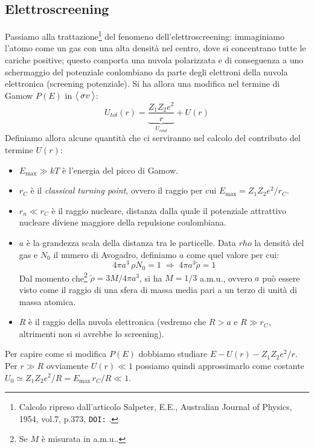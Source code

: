 \subsection{Elettroscreening}\label{0329-sec-screening}
Passiamo alla trattazione\footnote{Calcolo ripreso dall'articolo Salpeter, E.E., Australian Journal of Physics, 1954, vol.7, p.373, \texttt{DOI:} .} del fenomeno dell'elettroscreening: immaginiamo l'atomo come un gas con una alta densità nel centro, dove si concentrano tutte le cariche positive; questo comporta una nuvola polarizzata e di conseguenza a uno schermaggio del potenziale coulombiano da parte degli elettroni della nuvola elettronica (screening potenziale). Si ha allora una modifica nel termine di Gamow $P(E)$ in $\bigl\langle\, \sigma v\, \bigr\rangle$:
$$U_{tot} (r) = \underbrace{\frac{Z_1Z_2e^2}{r}}_{U_{coul}} + U(r)$$
Definiamo allora alcune quantità che ci serviranno nel calcolo del contributo del termine $U(r)$:
\begin{itemize}
    \item $E_{\max{}}\gg kT$ è l'energia del picco di Gamow.
    \item $r_C$ è il \textit{classical turning point}, ovvero il raggio per cui $E_{\max{}} = Z_1Z_2e^2/r_C$.
    \item $r_n\ll r_C$ è il raggio nucleare, distanza dalla quale il potenziale attrattivo nucleare diviene maggiore della repulsione coulombiana.
    \item $a$ è la grandezza scala della distanza tra le particelle. Data $rho$ la densità del gas e $N_0$ il numero di Avogadro, definiamo $a$ come quel valore per cui:
    $$4\pi a^3\,\rho N_0 =1 \;\Rightarrow\; 4\pi a^3 \tilde{\rho} = 1$$
    Dal momento che\footnote{Se $M$ è misurata in a.m.u..} $\tilde{\rho} = 3M/4\pi a^3$, si ha $M= 1/3$ a.m.u., ovvero $a$ può essere visto come il raggio di una sfera di massa media pari a un terzo di unità di massa atomica.
    \item $R$ è il raggio della nuvola elettronica (vedremo che $R>a$ e $R\gg r_C$, altrimenti non si avrebbe lo screening).
\end{itemize}
Per capire come si modifica $P(E)$ dobbiamo studiare $E-U(r)-Z_1Z_2e^2/r$. Per $r\gg R$ ovviamente $U(r)\ll 1$ possiamo quindi approssimarlo come costante $U_0 \simeq Z_1Z_2e^2/R = E_{\max{}}\, r_C/R\ll1$.
